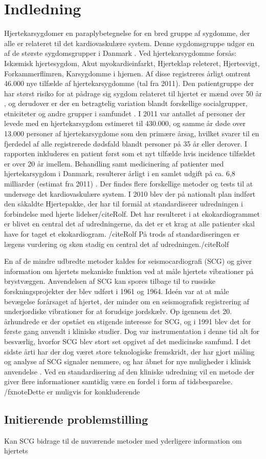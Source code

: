 \chapter{Indledning} \label{Indledning}

\textquotedbl Hjertekarsygdom\textquotedbl er en paraplybetegnelse for en bred gruppe af sygdomme, der alle er relateret til det kardiovaskulære system. Denne sygdomsgruppe udgør en af de største sygdomsgrupper i Danmark \cite{livet}. Ved hjertekarsygdomme forsås: Iskæmisk hjertesygdom, Akut myokardieinfarkt, Hjerteklap releteret, Hjertesvigt, Forkammerflimren, Karsygdomme i hjernen\cite{2011}. Af disse registreres årligt omtrent 46.000 nye tilfælde af hjertekarsygdomme (tal fra 2011). Den patientgruppe der har størst risiko for at pådrage sig sygdom relateret til hjertet er mænd over 50 år \cite{2011}, og derudover er der en betragtelig variation blandt forskellige socialgrupper, etniciteter og andre grupper i samfundet \cite{hjerteforening}. I 2011 var antallet af personer der levede med en hjertekarsygdom estimeret til 430.000, og samme år døde over 13.000 personer af hjertekarsygdome som den primære årsag, hvilket svarer til en fjerdedel af alle registrerede dødsfald blandt personer på 35 år eller derover. I rapporten inkluderes en patient først som et nyt tilfælde hvis incidence tilfældet er over 20 år imellem.\cite{2011} Behandling samt medicinering af patienter med hjertekarsygdom i Danmark, resulterer årligt i en samlet udgift på ca. 6,8 milliarder (estimat fra 2011) \cite{hjerteforening}. Der findes flere forskellige metoder og tests til at undersøge det kardiovaskulære system. I 2010 blev der på nationalt plan indført den såkaldte Hjertepakke, der har til formål at standardiserer udredningen i forbindelse med hjerte lidelser/cite{Rolf}. Det har resulteret i at ekokardiogrammet er blivet en central det af udredningerne, da det er et krag at alle patienter skal have for taget et ekokardiogram. /cite{Rolf} På trods af standardiseringen er lægens vurdering og skøn stadig en central det af udredningen./cite{Rolf}


 En af de mindre udbredte metoder kaldes for seismocardiografi (SCG) og giver information om hjertets mekaniske funktion ved at måle hjertets vibrationer på brystvæggen. Anvendelsen af SCG kan spores tilbage til to russiske forskningsprojekter der blev udført  i 1961 og 1964. Ideén var at at måle bevægelse forårsaget af hjertet, der minder om en seismografisk registrering af underjordiske vibrationer for at forudsige jordskælv. Op igennem det 20. århundrede er der opstået en stigende interesse for SCG, og i 1991 blev det for første gang anvendt i kliniske studier. Dog var instrumentation i denne tid alt for besværlig, hvorfor SCG blev stort set opgivet af det medicinske samfund. I det sidste årti har der dog været store teknologiske fremskridt, der har gjort måling og analyse af SCG signaler nemmere, og har åbnet for nye muligheder i klinisk anvendelse \cite{onan} \cite{zanetti}. Ved en standardisering af den kliniske udredning vil en metode der giver flere informationer samtidig være en fordel i form af tidsbesparelse. /fxnote{Dette er muligvis for konkluderende}

\section{Initierende problemstilling} Kan SCG bidrage til de nuværende metoder med yderligere information om hjertets